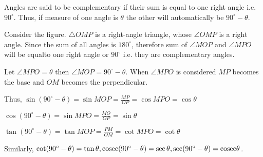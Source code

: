 Angles are said to be complementary if their sum is equal to one right angle i.e. $90^\circ$. Thus, if measure of one angle is
$\theta$ the other will automatically be $90^\circ - \theta$.

Consider the figure. $\triangle OMP$ is a right-angle triangle, whose $\angle OMP$ is a right angle. Since the sum of all angles is
$180^\circ$, therefore sum of $\angle MOP$ and $\angle MPO$ will be equalto one right angle or $90^\circ$ i.e. they are
complementary angles.

Let $\angle MPO = \theta$ then $\angle MOP = 90^\circ - \theta$. When $\angle MPO$ is considered $MP$ becomes the base and $OM$
becomes the perpendicular.

Thus, $\sin(90^\circ - \theta) = \sin MOP = \frac{MP}{OP} = \cos MPO = \cos\theta$

$\cos(90^\circ - \theta) = \sin MPO = \frac{MO}{OP} = \sin\theta$

$\tan(90^\circ - \theta) = \tan MOP = \frac{PM}{OM} = \cot MPO = \cot\theta$

Similarly, $\cot(90^\circ - \theta) =\tan\theta, {\rm cosec}(90^\circ - \theta) = \sec\theta, \sec(90^\circ - \theta) = {\rm
cosec}\theta$.

